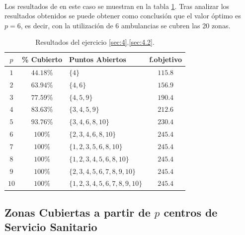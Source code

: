 \documentclass[spanish]{article}
\begin{document}
			\paragraph{}
			Los resultados de en este caso se muestran en la tabla \ref{table:sol-4.2}. Tras analizar los resultados obtenidos se puede obtener como conclusión que el valor óptimo es $p = 6$, es decir, con la utilización de 6 ambulancias se cubren las 20 zonas.


			\begin{table}[h]
				\begin{center}
					\begin{tabular}{|c || c || l || c | }
						\hline
						$p$		&	\% Cubierto	& Puntos Abiertos 					& f.objetivo \\ \hline \hline
						$1$ 	& $44.18\%$ & $\{4\}$ 										& $115.8$ \\ \hline
		     		$2$ 	& $63.94\%$ & $\{4, 6\}$									& $156.9$ \\ \hline
						$3$ 	& $77.59\%$ & $\{4,5,9\}$ 								& $190.4$ \\ \hline
						$4$ 	& $83.63\%$ & $\{3,4,5,9\}$ 							& $212.6$ \\ \hline
						$5$ 	& $93.76\%$ & $\{3,4,6,8,10\}$ 						& $230.4$ \\ \hline
						$6$ 	& $100\%$ 	& $\{2,3,4,6,8,10\}$					& $245.4$ \\ \hline
						$7$ 	& $100\%$ 	& $\{1,2,3,5,6,8,10 \}$				& $245.4$ \\ \hline
						$8$ 	& $100\%$ 	& $\{1,2,3,4,5,6,8,10\}$			& $245.4$ \\ \hline
						$9$ 	& $100\%$ 	& $\{2,3,4,5,6,7,8,9,10\}$ 		& $245.4$ \\ \hline
						$10$	& $100\%$ 	& $\{1,2,3,4,5,6,7,8,9,10\}$	& $245.4$ \\
						\hline
					\end{tabular}
				\end{center}
				\caption{Resultados del ejercicio \ref{sec:4}.\ref{sec:4.2}.}
				\label{table:sol-4.2}
			\end{table}


		\subsection{Zonas Cubiertas a partir de $p$ centros de Servicio Sanitario}
		\label{sec:4.3}
\end{document}
